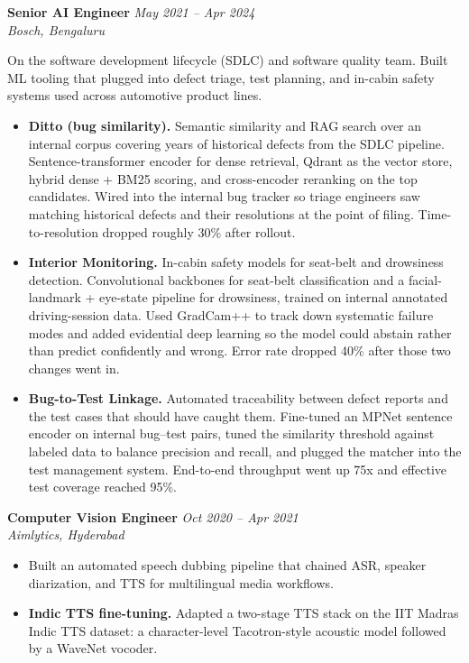 \documentclass[a4paper,10pt]{article}
\newcommand{\roleheader}[4]{
    \needspace{5\baselineskip}%
    \textbf{#1} \hfill \textit{#4} \\
    \textit{#2, #3}%
    \nopagebreak
}
\begin{document}
\vspace{0.08cm}

\roleheader{Senior AI Engineer}{Bosch}{Bengaluru}{May 2021 -- Apr 2024}

On the software development lifecycle (SDLC) and software quality team. Built ML tooling that plugged into defect triage, test planning, and in-cabin safety systems used across automotive product lines.

\begin{itemize}[leftmargin=*, itemsep=3pt, topsep=4pt]
    \item \textbf{Ditto (bug similarity).} Semantic similarity and RAG search over an internal corpus covering years of historical defects from the SDLC pipeline. Sentence-transformer encoder for dense retrieval, Qdrant as the vector store, hybrid dense + BM25 scoring, and cross-encoder reranking on the top candidates. Wired into the internal bug tracker so triage engineers saw matching historical defects and their resolutions at the point of filing. Time-to-resolution dropped roughly 30\% after rollout.
    \item \textbf{Interior Monitoring.} In-cabin safety models for seat-belt and drowsiness detection. Convolutional backbones for seat-belt classification and a facial-landmark + eye-state pipeline for drowsiness, trained on internal annotated driving-session data. Used GradCam++ to track down systematic failure modes and added evidential deep learning so the model could abstain rather than predict confidently and wrong. Error rate dropped 40\% after those two changes went in.
    \item \textbf{Bug-to-Test Linkage.} Automated traceability between defect reports and the test cases that should have caught them. Fine-tuned an MPNet sentence encoder on internal bug--test pairs, tuned the similarity threshold against labeled data to balance precision and recall, and plugged the matcher into the test management system. End-to-end throughput went up 75x and effective test coverage reached 95\%.
\end{itemize}

\vspace{0.08cm}

\roleheader{Computer Vision Engineer}{Aimlytics}{Hyderabad}{Oct 2020 -- Apr 2021}
\begin{itemize}[leftmargin=*, itemsep=3pt, topsep=4pt]
    \item Built an automated speech dubbing pipeline that chained ASR, speaker diarization, and TTS for multilingual media workflows.
    \item \textbf{Indic TTS fine-tuning.} Adapted a two-stage TTS stack on the IIT Madras Indic TTS dataset: a character-level Tacotron-style acoustic model followed by a WaveNet vocoder.
\end{itemize}
\end{document}
